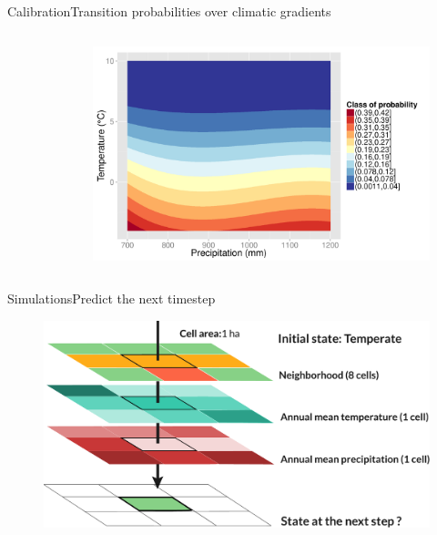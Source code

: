 \documentclass[10pt,aspectratio=149]{beamer}
\begin{document}
\begin{frame}{Calibration}{Transition probabilities over climatic gradients}

	  \begin{columns}[t]
        \begin{column}{0.15\linewidth}
        \vspace{-4em}
        \begin{figure}
			\small{}
		\end{figure}
        \end{column}
		\hspace{1em}
        \begin{column}{0.82\linewidth}
            \begin{figure}
	          \includegraphics[width=1\linewidth]{Figs/betab.pdf}
	        \end{figure}
        \end{column}
      \end{columns}
	
\end{frame}


\begin{frame}{Simulations}{Predict the next timestep}

		\begin{figure}
			\includegraphics[width=1.2\paperheight]{Figs/explicit.pdf}
		\end{figure}
		
	
\end{frame}
\end{document}
